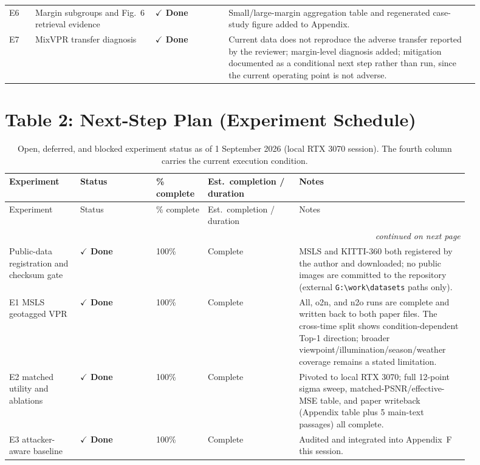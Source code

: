 \documentclass[11pt]{article}
\newcommand{\done}{\textcolor{DoneGreen}{\textbf{$\checkmark$ Done}}}
\begin{document}
\begin{longtable}{@{}p{0.05\linewidth}p{0.23\linewidth}p{0.14\linewidth}p{0.48\linewidth}@{}}
E6 & Margin subgroups and Fig.~6 retrieval evidence & \done & Small/large-margin aggregation table and regenerated case-study figure added to Appendix. \\
E7 & MixVPR transfer diagnosis & \done & Current data does not reproduce the adverse transfer reported by the reviewer; margin-level diagnosis added; mitigation documented as a conditional next step rather than run, since the current operating point is not adverse. \\
\end{longtable}

\section*{Table 2: Next-Step Plan (Experiment Schedule)}

\begin{longtable}{@{}p{0.14\linewidth}p{0.15\linewidth}p{0.10\linewidth}p{0.18\linewidth}p{0.31\linewidth}@{}}
\caption{Open, deferred, and blocked experiment status as of 1 September 2026
(local RTX 3070 session). The fourth column carries the current execution
condition.}
\label{tab:schedule}\\
\toprule
Experiment & Status & \% complete & Est.\ completion / duration & Notes \\
\midrule
\endfirsthead
\toprule
Experiment & Status & \% complete & Est.\ completion / duration & Notes \\
\midrule
\endhead
\midrule
\multicolumn{5}{r}{\itshape continued on next page} \\
\endfoot
\bottomrule
\endlastfoot
Public-data registration and checksum gate & \done & 100\% & Complete & MSLS and KITTI-360 both registered by the author and downloaded; no public images are committed to the repository (external \texttt{G:\textbackslash work\textbackslash datasets} paths only). \\
E1 MSLS geotagged VPR & \done & 100\% & Complete & All, o2n, and n2o runs are complete and written back to both paper files. The cross-time split shows condition-dependent Top-1 direction; broader viewpoint/illumination/season/weather coverage remains a stated limitation. \\
E2 matched utility and ablations & \done & 100\% & Complete & Pivoted to local RTX 3070; full 12-point sigma sweep, matched-PSNR/effective-MSE table, and paper writeback (Appendix table plus 5 main-text passages) all complete. \\
E3 attacker-aware baseline & \done & 100\% & Complete & Audited and integrated into Appendix~F this session. \\

\end{longtable}
\end{document}
